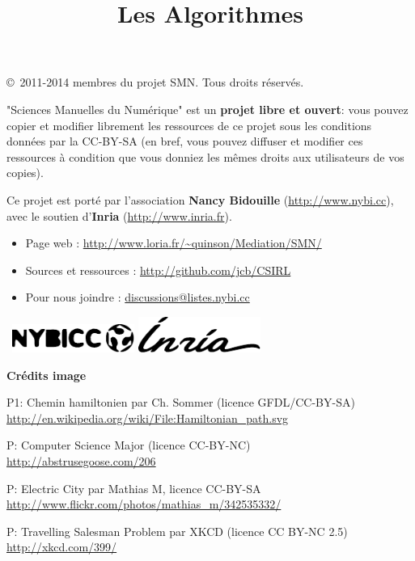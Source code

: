 \documentclass[a5paper,pagesize,DIV=14]{scrbook}
\title{Les Algorithmes}
\date{}
\begin{document}



\copyright\ 2011-2014 membres du projet SMN. Tous droits réservés.
  
"Sciences Manuelles du Numérique" est un \textbf{projet libre et ouvert}: vous
pouvez copier et modifier librement les ressources de ce projet sous les
conditions données par la CC-BY-SA (en bref, vous pouvez diffuser et modifier
ces ressources à condition que vous donniez les mêmes droits aux utilisateurs de
vos copies).

\bigskip

Ce projet est porté par l'association \textbf{Nancy Bidouille}
(\url{http://www.nybi.cc}), avec le soutien d'\textbf{Inria}
(\url{http://www.inria.fr}).
  
\bigskip

\begin{itemize}
\item Page web : \url{http://www.loria.fr/~quinson/Mediation/SMN/}
\item Sources et ressources : \url{http://github.com/jcb/CSIRL}
\item Pour nous joindre : \url{discussions@listes.nybi.cc}
\end{itemize}

\bigskip
~\hfill\includegraphics[width=0.3\textwidth]{img/logo_nybicc.pdf}\hfill
\includegraphics[width=0.3\textwidth]{img/logo_inria.pdf}\hfill~

\vfill
\textbf{Crédits image}

{\footnotesize

P1: Chemin hamiltonien par Ch. Sommer (licence GFDL/CC-BY-SA)\\
\url{http://en.wikipedia.org/wiki/File:Hamiltonian_path.svg}

P\pageref{img:CSmajor}: Computer Science Major (licence CC-BY-NC)\\
\url{http://abstrusegoose.com/206}


P\pageref{img:electric:city}: Electric City par Mathias M, licence CC-BY-SA
\url{http://www.flickr.com/photos/mathias_m/342535332/}
  
P\pageref{img:tsp_xkcd}: Travelling Salesman Problem par XKCD (licence CC BY-NC 2.5)\\
\url{http://xkcd.com/399/}
}
\end{document}
